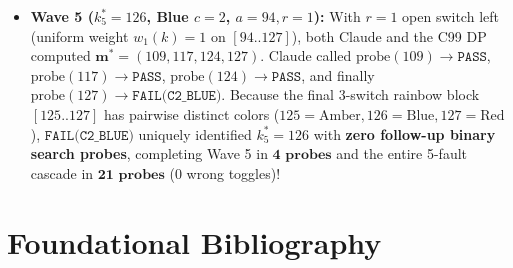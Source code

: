 \documentclass[11pt,a4paper]{article}
\theoremstyle{definition}
\theoremstyle{remark}
\begin{document}
\begin{itemize}
    \item \textbf{Wave 5 ($k^*_5 = 126$, Blue $c=2$, $a=94, r=1$):} With $r=1$ open switch left (uniform weight $w_1(k) = 1$ on $[94..127]$), both Claude and the C99 DP computed $\bm{m}^* = (109, 117, 124, 127)$. Claude called $\text{probe}(109) \to \texttt{PASS}$, $\text{probe}(117) \to \texttt{PASS}$, $\text{probe}(124) \to \texttt{PASS}$, and finally $\text{probe}(127) \to \texttt{FAIL(C2\_BLUE)}$. Because the final 3-switch rainbow block $[125..127]$ has pairwise distinct colors ($125 = \text{Amber}, 126 = \text{Blue}, 127 = \text{Red}$), $\texttt{FAIL(C2\_BLUE)}$ uniquely identified $k^*_5 = 126$ with \textbf{zero follow-up binary search probes}, completing Wave 5 in $\mathbf{4\text{ probes}}$ and the entire 5-fault cascade in $\mathbf{21\text{ probes}}$ ($0$ wrong toggles)!
\end{itemize}

\section{Foundational Bibliography}
\end{document}
